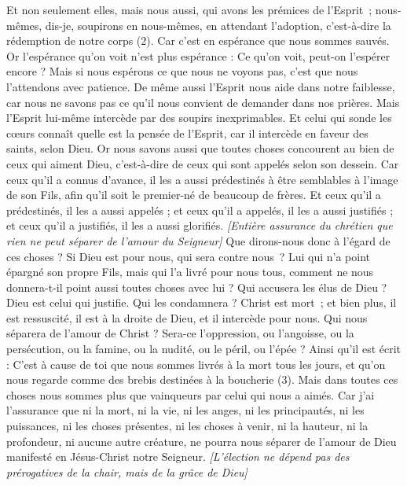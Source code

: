 \begin{multicols}{2}
Et non seulement elles, mais nous aussi, qui avons les prémices de l'Esprit ; nous-mêmes, dis-je, soupirons en nous-mêmes, en attendant l'adoption, c'est-à-dire la rédemption de notre corps (2).
Car c’est en espérance que nous sommes sauvés. Or l’espérance qu’on voit n’est plus espérance : Ce qu’on voit, peut-on l’espérer encore ?
Mais si nous espérons ce que nous ne voyons pas, c'est que nous l'attendons avec patience.
De même aussi l’Esprit nous aide dans notre faiblesse, car nous ne savons pas ce qu’il nous convient de demander dans nos prières. Mais l’Esprit lui-même intercède par des soupirs inexprimables.
Et celui qui sonde les cœurs connaît quelle est la pensée de l'Esprit, car il intercède en faveur des saints, selon Dieu.
Or nous savons aussi que toutes choses concourent au bien de ceux qui aiment Dieu, c'est-à-dire de ceux qui sont appelés selon son dessein.
Car ceux qu'il a connus d’avance, il les a aussi prédestinés à être semblables à l'image de son Fils, afin qu'il soit le premier-né de beaucoup de frères.
Et ceux qu'il a prédestinés, il les a aussi appelés ; et ceux qu'il a appelés, il les a aussi justifiés ; et ceux qu'il a justifiés, il les a aussi glorifiés.
\textit{[Entière assurance du chrétien que rien ne peut séparer de l'amour du Seigneur]}
Que dirons-nous donc à l’égard de ces choses ? Si Dieu est pour nous, qui sera contre nous ?
Lui qui n'a point épargné son propre Fils, mais qui l'a livré pour nous tous, comment ne nous donnera-t-il point aussi toutes choses avec lui ?
Qui accusera les élus de Dieu ? Dieu est celui qui justifie.
Qui les condamnera ? Christ est mort ; et bien plus, il est ressuscité, il est à la droite de Dieu, et il intercède pour nous.
Qui nous séparera de l'amour de Christ ? Sera-ce l'oppression, ou l'angoisse, ou la persécution, ou la famine, ou la nudité, ou le péril, ou l'épée ?
Ainsi qu'il est écrit : C’est à cause de toi que nous sommes livrés à la mort tous les jours, et qu’on nous regarde comme des brebis destinées à la boucherie (3).
Mais dans toutes ces choses nous sommes plus que vainqueurs par celui qui nous a aimés.
Car j’ai l’assurance que ni la mort, ni la vie, ni les anges, ni les principautés, ni les puissances, ni les choses présentes, ni les choses à venir,
ni la hauteur, ni la profondeur, ni aucune autre créature, ne pourra nous séparer de l'amour de Dieu manifesté en Jésus-Christ notre Seigneur.
\textit{[L'élection ne dépend pas des prérogatives de la chair, mais de la grâce de Dieu]}

\end{multicols}
